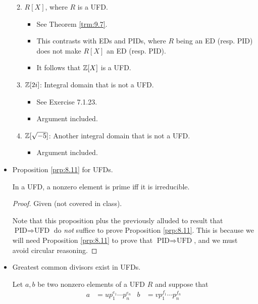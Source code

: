 \documentclass[../notes.tex]{subfiles}
\begin{document}
\begin{itemize}
\begin{enumerate}
\begin{itemize}
        \end{itemize}
        \item $R[X]$, where $R$ is a UFD.
        \begin{itemize}
            \item See Theorem \ref{trm:9.7}.
            \item This contrasts with EDs and PIDs, where $R$ being an ED (resp. PID) does not make $R[X]$ an ED (resp. PID).
            \item It follows that $\mathbb{Z}[X]$ is a UFD.
        \end{itemize}
        \item $\mathbb{Z}[2i]$: Integral domain that is not a UFD.
        \begin{itemize}
            \item See Exercise 7.1.23.
            \item Argument included.
        \end{itemize}
        \item $\mathbb{Z}[\sqrt{-5}]$: Another integral domain that is not a UFD.
        \begin{itemize}
            \item Argument included.
        \end{itemize}
    \end{enumerate}
    \item Proposition \ref{prp:8.11} for UFDs.
    \begin{proposition}\label{prp:8.12}
        In a UFD, a nonzero element is prime iff it is irreducible.
        \begin{proof}
            Given (not covered in class).\par
            Note that this proposition plus the previously alluded to result that $\text{PID}\Longrightarrow\text{UFD}$ do \emph{not} suffice to prove Proposition \ref{prp:8.11}. This is because we will need Proposition \ref{prp:8.11} to prove that $\text{PID}\Longrightarrow\text{UFD}$, and we must avoid circular reasoning.
        \end{proof}
    \end{proposition}
    \item Greatest common divisors exist in UFDs.
    \begin{proposition}\label{prp:8.13}
        Let $a,b$ be two nonzero elements of a UFD $R$ and suppose that
        \begin{align*}
            a &= up_1^{e_1}\cdots p_n^{e_n}&
            b &= vp_1^{f_1}\cdots p_n^{f_n}
        \end{align*}

\end{proposition}
\end{itemize}
\end{document}
